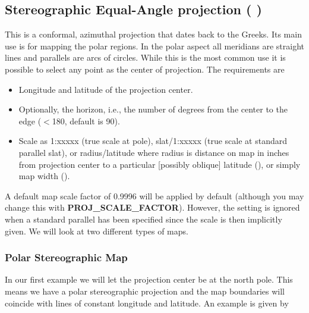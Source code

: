 

\subsection{Stereographic Equal-Angle projection ( )}

This is a conformal, azimuthal projection that dates back to the
Greeks.  Its main use is for mapping the polar regions.  In
the polar aspect all meridians are straight lines and parallels
are arcs of circles.  While this is the most common use it is
possible to select any point as the center of projection.  The
requirements are

\begin{itemize}
\item Longitude and latitude of the projection center.
\item Optionally, the horizon, i.e., the number of degrees from the center to the edge ($<$180\DS, default is 90\DS).
\item Scale as 1:xxxxx (true scale at pole), slat/1:xxxxx
(true scale at standard parallel slat), or radius/latitude where
radius is distance on map in inches from projection center to
a particular [possibly oblique] latitude (), or simply map
width ().
\end{itemize}

A default map scale factor of 0.9996 will be applied by default
(although you may change this with \textbf{PROJ\_SCALE\_FACTOR}).
However, the setting is ignored when a standard
parallel has been specified since the scale is then implicitly given.
We will look at two different types of maps.

\subsubsection{Polar Stereographic Map} 

In our first example we will let the projection center be at
the north pole.  This means we have a polar stereographic
projection and the map boundaries will coincide with lines
of constant longitude and latitude.  An example is given by

